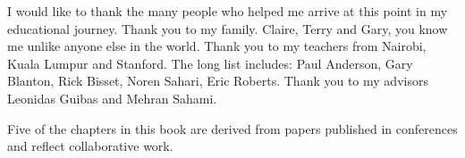 I would like to thank the many people who helped me arrive at this point in my educational journey. Thank you to my family. Claire, Terry and Gary, you know me unlike anyone else in the world. Thank you to my teachers from Nairobi, Kuala Lumpur and Stanford. The long list includes: Paul Anderson, Gary Blanton, Rick Bisset, Noren Sahari, Eric Roberts. Thank you to my advisors Leonidas Guibas and Mehran Sahami. 

Five of the chapters in this book are derived from papers published in conferences and reflect collaborative work. 